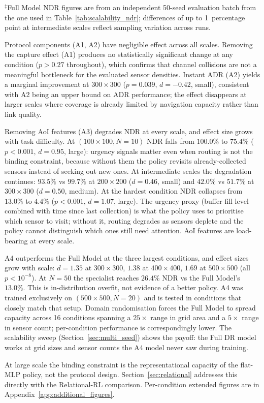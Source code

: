 {\small $^\ddagger$Full Model NDR figures are from an independent 50-seed evaluation batch
from the one used in Table~\ref{tab:scalability_ndr}; differences of up to
1~percentage point at intermediate scales reflect sampling variation across runs.}

\medskip

Protocol components (A1, A2) have negligible effect across all scales. Removing the
capture effect (A1) produces no statistically significant change at any condition
($p > 0.27$ throughout), which confirms that channel collisions are not a meaningful
bottleneck for the evaluated sensor densities. Instant ADR (A2) yields a marginal
improvement at $300{\times}300$ ($p{=}0.039$, $d{=}-0.42$, small), consistent with A2
being an upper bound on ADR performance; the effect disappears at larger scales
where coverage is already limited by navigation capacity rather than link quality.

Removing AoI features (A3) degrades NDR at every scale, and effect size grows with task difficulty. At $(100{\times}100, N{=}10)$ NDR falls from $100.0\%$ to $75.4\%$ ($p < 0.001$, $d = 0.95$, large): urgency signals matter even when routing is not the binding constraint, because without them the policy revisits already-collected sensors instead of seeking out new ones. At intermediate scales the degradation continues: $93.5\%$ vs $99.7\%$ at $200{\times}200$ ($d = 0.46$, small) and $42.0\%$ vs $51.7\%$ at $300{\times}300$ ($d = 0.50$, medium). At the hardest condition NDR collapses from $13.0\%$ to $4.4\%$ ($p < 0.001$, $d = 1.07$, large). The urgency proxy (buffer fill level combined with time since last collection) is what the policy uses to prioritise which sensor to visit; without it, routing degrades as sensors deplete and the policy cannot distinguish which ones still need attention. AoI features are load-bearing at every scale.

A4 outperforms the Full Model at the three largest conditions, and effect sizes grow with scale: $d = 1.35$ at $300{\times}300$, $1.38$ at $400{\times}400$, $1.69$ at $500{\times}500$ (all $p < 10^{-8}$). At $N{=}50$ the specialist reaches $26.4\%$ NDR vs the Full Model's $13.0\%$. This is in-distribution overfit, not evidence of a better policy. A4 was trained exclusively on $(500{\times}500, N{=}20)$ and is tested in conditions that closely match that setup. Domain randomisation forces the Full Model to spread capacity across 16 conditions spanning a $25\times$ range in grid area and a $5\times$ range in sensor count; per-condition performance is correspondingly lower. The scalability sweep (Section~\ref{sec:multi_seed}) shows the payoff: the Full DR model works at grid sizes and sensor counts the A4 model never saw during training.

At large scale the binding constraint is the representational capacity of the
flat-MLP policy, not the protocol design. Section~\ref{sec:relational} addresses this directly with the Relational-RL comparison. Per-condition extended figures are in
Appendix~\ref{app:additional_figures}.
